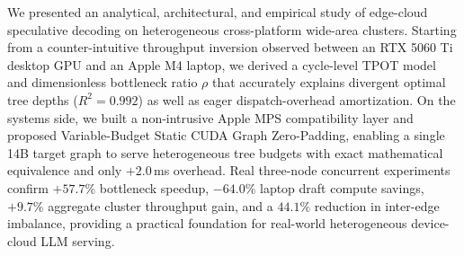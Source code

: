 \documentclass[10pt,conference]{IEEEtran}
\begin{document}
We presented an analytical, architectural, and empirical study of edge-cloud speculative decoding on heterogeneous cross-platform wide-area clusters. Starting from a counter-intuitive throughput inversion observed between an RTX 5060 Ti desktop GPU and an Apple M4 laptop, we derived a cycle-level TPOT model and dimensionless bottleneck ratio $\rho$ that accurately explains divergent optimal tree depths ($R^2{=}0.992$) as well as eager dispatch-overhead amortization. On the systems side, we built a non-intrusive Apple MPS compatibility layer and proposed Variable-Budget Static CUDA Graph Zero-Padding, enabling a single 14B target graph to serve heterogeneous tree budgets with exact mathematical equivalence and only $+2.0$\,ms overhead. Real three-node concurrent experiments confirm $+57.7\%$ bottleneck speedup, $-64.0\%$ laptop draft compute savings, $+9.7\%$ aggregate cluster throughput gain, and a $44.1\%$ reduction in inter-edge imbalance, providing a practical foundation for real-world heterogeneous device-cloud LLM serving.
\end{document}
